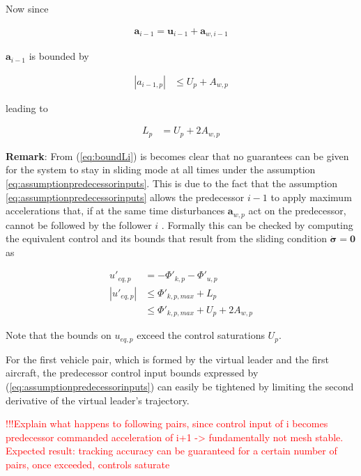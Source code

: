\documentclass{ifacconf}
\providecommand{\mbf}[1]{\mathbf{#1}}
\newcommand{\idxFollower}{{\ensuremath{i} }}
\newcommand{\idxPredecessor}{{\ensuremath{i-1} }}
\newcommand{\idxAxis}{{\ensuremath{p}}}
\begin{document}
Now since

\begin{align}
\mbf{a}_{\idxPredecessor} = \mbf{u}_{\idxPredecessor} + \mbf{a}_{w, \idxPredecessor}
\end{align}

$\mbf{a}_{\idxPredecessor}$ is bounded by

\begin{align}
|a_{\idxPredecessor,\idxAxis}| &\leq U_\idxAxis + A_{w,\idxAxis}
\end{align}

leading to 

\begin{align}
L_\idxAxis &= U_\idxAxis + 2 A_{w,\idxAxis}
\label{eq:boundLi}
\end{align}

\textbf{Remark}: From (\ref{eq:boundLi}) is becomes clear that no guarantees can be given for the system to stay in sliding mode at all times under the assumption \ref{eq:assumptionpredecessorinputs}. This is due to the fact that the assumption \ref{eq:assumptionpredecessorinputs} allows the predecessor \idxPredecessor to apply maximum accelerations that, if at the same time disturbances $\mbf{a}_{w, \idxAxis}$ act on the predecessor, cannot be followed by the follower \idxFollower. Formally this can be checked by computing the equivalent control and its bounds that result from the sliding condition $\dot{\mbf{\sigma}} = \mbf{0}$ as

\begin{align}
{u}'_{eq,\idxAxis} &= - {\Phi}'_{k, \idxAxis} - {\Phi}'_{u, \idxAxis}\\
|{u}'_{eq,\idxAxis}| &\leq {\Phi}'_{k, \idxAxis, max} + L_\idxAxis \\
{} &\leq {\Phi}'_{k, \idxAxis, max} + U_\idxAxis + 2 A_{w,\idxAxis}
\end{align}

Note that the bounds on $u_{eq,\idxAxis} $ exceed the control saturations $U_\idxAxis$.

For the first vehicle pair, which is formed by the virtual leader and the first aircraft, the predecessor control input bounds expressed by (\ref{eq:assumptionpredecessorinputs}) can easily be tightened by limiting the second derivative of the virtual leader's trajectory. 

\textcolor{red}{!!!Explain what happens to following pairs, since control input of i becomes predecessor commanded acceleration of i+1 -> fundamentally not mesh stable. Expected result: tracking accuracy can be guaranteed for a certain number of pairs, once exceeded, controls saturate}
\end{document}
